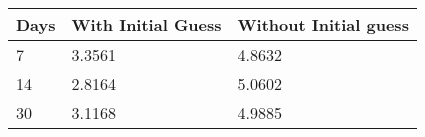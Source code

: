 \begin{tabular}{lll}
Days & With Initial Guess & Without Initial guess \\ 
\hline 
7 & 3.3561 & 4.8632 \\ 
14 & 2.8164 & 5.0602 \\ 
30 & 3.1168 & 4.9885 \\ 
\hline 
\end{tabular}